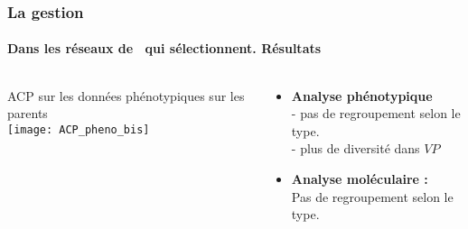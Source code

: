 \begin{frame}
\frametitle{La gestion \insitu}
\framesubtitle{Dans les réseaux de \MSPs~qui sélectionnent. Résultats}

\begin{columns}

\begin{column}{.6\textwidth}
ACP sur les données phénotypiques sur les parents \\
\texttt{[image: ACP\_pheno\_bis]}
\end{column}

\begin{column}{.4\textwidth}

\begin{itemize}

\item \textbf{Analyse phénotypique} \\
- pas de regroupement selon le type.\\
- plus de diversité dans $VP$

\item \textbf{Analyse moléculaire :} \\
Pas de regroupement selon le type.

\end{itemize}

\end{column}

\end{columns}

\end{frame}


